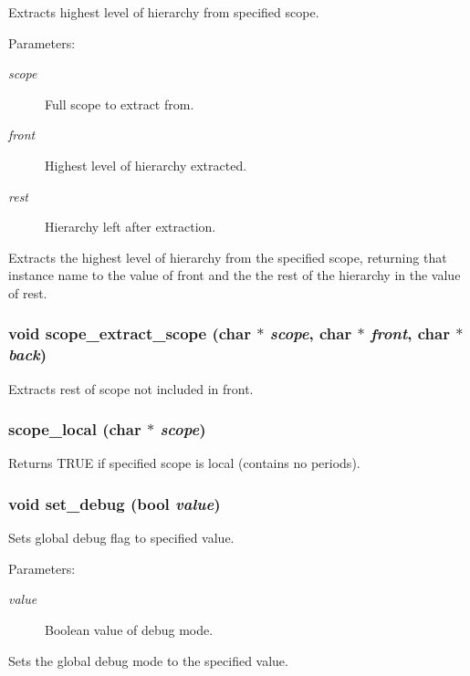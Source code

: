 Extracts highest level of hierarchy from specified scope. 

\begin{Desc}
\item[Parameters:]
\begin{description}
\item[{\em scope}]Full scope to extract from. \item[{\em front}]Highest level of hierarchy extracted. \item[{\em rest}]Hierarchy left after extraction.\end{description}
\end{Desc}
Extracts the highest level of hierarchy from the specified scope, returning that instance name to the value of front and the the rest of the hierarchy in the value of rest. 
\subsubsection{\setlength{\rightskip}{0pt plus 5cm}void scope\_\-extract\_\-scope (char $\ast$ {\em scope}, char $\ast$ {\em front}, char $\ast$ {\em back})}\label{util_8h_a11}


Extracts rest of scope not included in front. 

\subsubsection{ scope\_\-local (char $\ast$ {\em scope})}\label{util_8h_a12}


Returns TRUE if specified scope is local (contains no periods). 

\subsubsection{\setlength{\rightskip}{0pt plus 5cm}void set\_\-debug ({\bf bool} {\em value})}\label{util_8h_a1}


Sets global debug flag to specified value. 

\begin{Desc}
\item[Parameters:]
\begin{description}
\item[{\em value}]Boolean value of debug mode.\end{description}
\end{Desc}
Sets the global debug mode to the specified value. 
